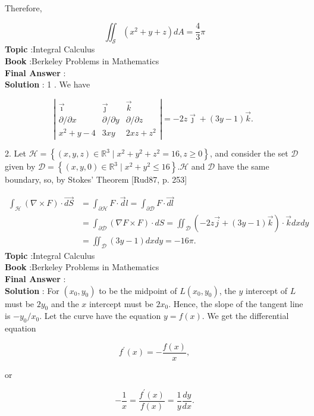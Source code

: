 \documentclass[10pt]{article}
\begin{document}
Therefore,

$$
\iint_{\mathcal{S}}\left(x^{2}+y+z\right) d A=\frac{4}{3} \pi
$$
\textbf{Topic} :Integral Calculus \\
\textbf{Book} :Berkeley Problems in Mathematics\\
\textbf{Final Answer} :\\


\textbf{Solution} : 1 . We have

$$
\left|\begin{array}{ccc}
\vec{\imath} & \vec{\jmath} & \vec{k} \\
\partial / \partial x & \partial / \partial y & \partial / \partial z \\
x^{2}+y-4 & 3 x y & 2 x z+z^{2}
\end{array}\right|=-2 z \vec{\jmath}+(3 y-1) \vec{k} \text {. }
$$

2. Let $\mathcal{H}=\left\{(x, y, z) \in \mathbb{R}^{3} \mid x^{2}+y^{2}+z^{2}=16, z \geqslant 0\right\}$, and consider the set $\mathcal{D}$ given by $\mathcal{D}=\left\{(x, y, 0) \in \mathbb{R}^{3} \mid x^{2}+y^{2} \leqslant 16\right\} . \mathcal{H}$ and $\mathcal{D}$ have the same boundary, so, by Stokes' Theorem [Rud87, p. 253]

$$
\begin{aligned}
\int_{\mathcal{H}}(\nabla \times F) \cdot \overrightarrow{d S} &=\int_{\partial \mathcal{H}} F \cdot \vec{d} l=\int_{\partial \mathcal{D}} F \cdot \overrightarrow{d l} \\
&=\int_{\partial \mathcal{D}}(\nabla F \times F) \cdot d S=\iint_{\mathcal{D}}(-2 z \vec{j}+(3 y-1) \vec{k}) \cdot \vec{k} d x d y \\
&=\iint_{\mathcal{D}}(3 y-1) d x d y=-16 \pi .
\end{aligned}
$$
\textbf{Topic} :Integral Calculus \\
\textbf{Book} :Berkeley Problems in Mathematics\\
\textbf{Final Answer} :\\


\textbf{Solution} : For $\left(x_{0}, y_{0}\right)$ to be the midpoint of $L\left(x_{0}, y_{0}\right)$, the $y$ intercept of $L$ must be $2 y_{0}$ and the $x$ intercept must be $2 x_{0}$. Hence, the slope of the tangent line is $-y_{0} / x_{0}$. Let the curve have the equation $y=f(x)$. We get the differential equation

$$
f^{\prime}(x)=-\frac{f(x)}{x},
$$

or

$$
-\frac{1}{x}=\frac{f^{\prime}(x)}{f(x)}=\frac{1}{y} \frac{d y}{d x} .
$$
\end{document}
